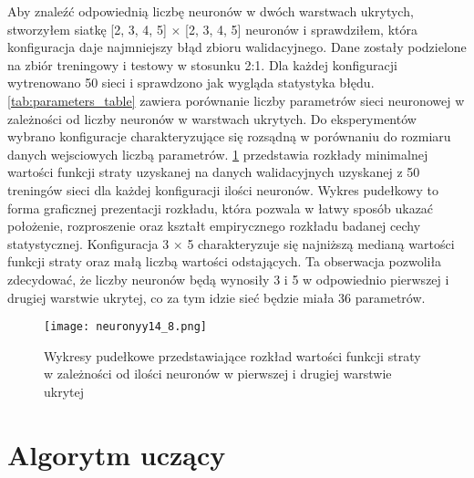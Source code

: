 \documentclass[11pt]{book}
\theoremstyle{definition}
\begin{document}
Aby znaleźć odpowiednią liczbę neuronów w dwóch warstwach ukrytych, stworzyłem siatkę [2, 3, 4, 5] $\times$ [2, 3, 4, 5] neuronów i sprawdziłem, która konfiguracja daje najmniejszy błąd zbioru walidacyjnego. Dane zostały podzielone na zbiór treningowy i testowy w stosunku 2:1. Dla każdej konfiguracji wytrenowano 50 sieci i sprawdzono jak wygląda statystyka błędu. \tablename{} \ref{tab:parameters_table} zawiera porównanie liczby parametrów sieci neuronowej w zależności od liczby neuronów w warstwach ukrytych. Do eksperymentów wybrano konfiguracje charakteryzujące się rozsądną w porównaniu do rozmiaru danych wejsciowych liczbą parametrów. \figurename{} \ref{fig:neurony} przedstawia rozkłady minimalnej wartości funkcji straty uzyskanej na danych walidacyjnych uzyskanej z 50 treningów sieci dla każdej konfiguracji ilości neuronów. Wykres pudełkowy to forma graficznej prezentacji rozkładu, która pozwala w łatwy sposób ukazać położenie, rozproszenie oraz kształt empirycznego rozkładu badanej cechy statystycznej. Konfiguracja 3 $\times$ 5 charakteryzuje się najniższą medianą wartości funkcji straty oraz małą liczbą wartości odstających. Ta obserwacja pozwoliła zdecydować, że liczby neuronów będą wynosiły 3 i 5 w odpowiednio pierwszej i drugiej warstwie ukrytej, co za tym idzie sieć będzie miała 36 parametrów.




\begin{figure}[htp!]
	\centering
	\texttt{[image: neuronyy14\_8.png]}
	\caption{Wykresy pudełkowe przedstawiające rozkład wartości funkcji straty w zależności od ilości neuronów w pierwszej i drugiej warstwie ukrytej}
	\label{fig:neurony}
\end{figure}





\section{Algorytm uczący}
\label{alg_ucz}
\end{document}

